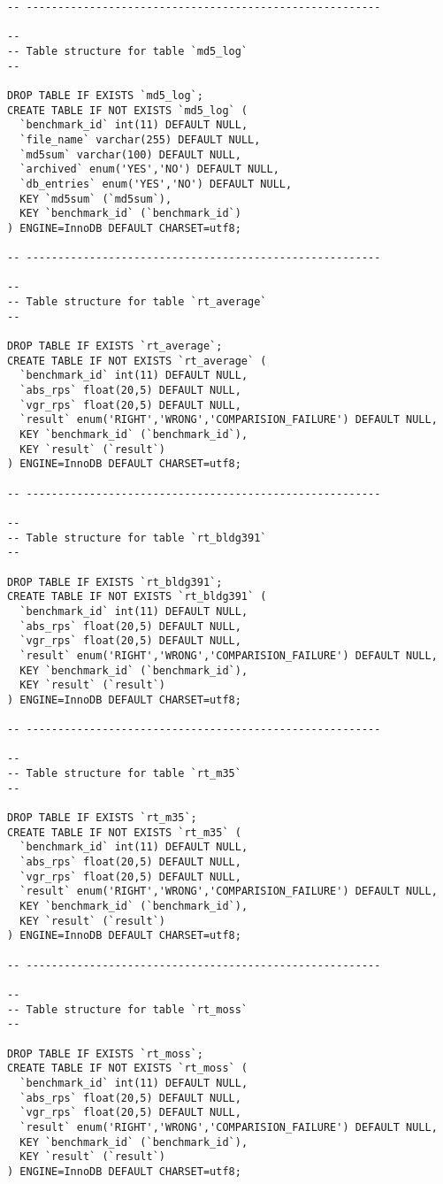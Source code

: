 \documentclass[a4paper,12pt, titlepage]{article}
\begin{document}
\begin{verbatim}
-- --------------------------------------------------------

--
-- Table structure for table `md5_log`
--

DROP TABLE IF EXISTS `md5_log`;
CREATE TABLE IF NOT EXISTS `md5_log` (
  `benchmark_id` int(11) DEFAULT NULL,
  `file_name` varchar(255) DEFAULT NULL,
  `md5sum` varchar(100) DEFAULT NULL,
  `archived` enum('YES','NO') DEFAULT NULL,
  `db_entries` enum('YES','NO') DEFAULT NULL,
  KEY `md5sum` (`md5sum`),
  KEY `benchmark_id` (`benchmark_id`)
) ENGINE=InnoDB DEFAULT CHARSET=utf8;

-- --------------------------------------------------------

--
-- Table structure for table `rt_average`
--

DROP TABLE IF EXISTS `rt_average`;
CREATE TABLE IF NOT EXISTS `rt_average` (
  `benchmark_id` int(11) DEFAULT NULL,
  `abs_rps` float(20,5) DEFAULT NULL,
  `vgr_rps` float(20,5) DEFAULT NULL,
  `result` enum('RIGHT','WRONG','COMPARISION_FAILURE') DEFAULT NULL,
  KEY `benchmark_id` (`benchmark_id`),
  KEY `result` (`result`)
) ENGINE=InnoDB DEFAULT CHARSET=utf8;

-- --------------------------------------------------------

--
-- Table structure for table `rt_bldg391`
--

DROP TABLE IF EXISTS `rt_bldg391`;
CREATE TABLE IF NOT EXISTS `rt_bldg391` (
  `benchmark_id` int(11) DEFAULT NULL,
  `abs_rps` float(20,5) DEFAULT NULL,
  `vgr_rps` float(20,5) DEFAULT NULL,
  `result` enum('RIGHT','WRONG','COMPARISION_FAILURE') DEFAULT NULL,
  KEY `benchmark_id` (`benchmark_id`),
  KEY `result` (`result`)
) ENGINE=InnoDB DEFAULT CHARSET=utf8;

-- --------------------------------------------------------

--
-- Table structure for table `rt_m35`
--

DROP TABLE IF EXISTS `rt_m35`;
CREATE TABLE IF NOT EXISTS `rt_m35` (
  `benchmark_id` int(11) DEFAULT NULL,
  `abs_rps` float(20,5) DEFAULT NULL,
  `vgr_rps` float(20,5) DEFAULT NULL,
  `result` enum('RIGHT','WRONG','COMPARISION_FAILURE') DEFAULT NULL,
  KEY `benchmark_id` (`benchmark_id`),
  KEY `result` (`result`)
) ENGINE=InnoDB DEFAULT CHARSET=utf8;

-- --------------------------------------------------------

--
-- Table structure for table `rt_moss`
--

DROP TABLE IF EXISTS `rt_moss`;
CREATE TABLE IF NOT EXISTS `rt_moss` (
  `benchmark_id` int(11) DEFAULT NULL,
  `abs_rps` float(20,5) DEFAULT NULL,
  `vgr_rps` float(20,5) DEFAULT NULL,
  `result` enum('RIGHT','WRONG','COMPARISION_FAILURE') DEFAULT NULL,
  KEY `benchmark_id` (`benchmark_id`),
  KEY `result` (`result`)
) ENGINE=InnoDB DEFAULT CHARSET=utf8;


\end{verbatim}
\end{document}
